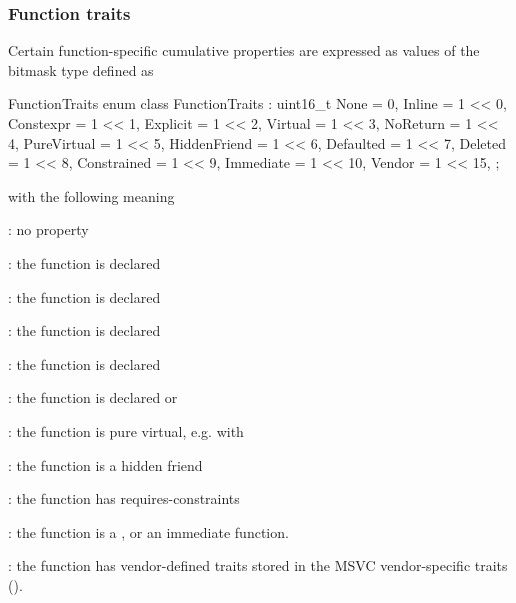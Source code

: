 
\subsubsection{Function traits}
\label{sec:ifc-function-traits}

Certain function-specific cumulative properties are expressed as values of the bitmask type  defined as
%
\begin{typedef}{FunctionTraits}{}
	enum class FunctionTraits : uint16_t {
		None			= 0,
		Inline			= 1 << 0,
		Constexpr		= 1 << 1,
		Explicit		= 1 << 2,
		Virtual			= 1 << 3,
		NoReturn		= 1 << 4,
		PureVirtual	= 1 << 5,
		HiddenFriend	= 1 << 6,
		Defaulted		= 1 << 7,
		Deleted		= 1 << 8,
		Constrained   = 1 << 9,
		Immediate = 1 << 10,
		Vendor			= 1 << 15,
	};
\end{typedef}
%
with the following meaning
\begin{description}
	\item {}: no property
	\item {}: the function is declared 
	\item {}: the function is declared 
	\item {}: the function is declared 
	\item {}: the function is declared 
	\item {}: the function is declared \code{[[noreturn]]} or 
	\item {}: the function is pure virtual, e.g. with 
	\item {}: the function is a hidden friend
     \item {} : the function has requires-constraints
     \item {}: the function is a , or an immediate function. 
     \item {}: the function has vendor-defined traits stored in the
	 MSVC vendor-specific traits ().
\end{description}


\subsection{} 
\label{sec:ifc:DeclSort:Method}

